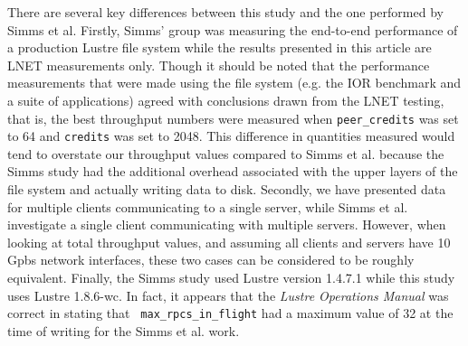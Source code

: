 \documentclass[]{sigplan-proc}
\begin{document}
There are several key differences between this study and the one performed by Simms et al. Firstly, Simms'
group was measuring the end-to-end performance of a production Lustre file system while the results presented
in this article are LNET measurements only. Though it should be noted that the performance measurements that
were made using the file system (e.g. the IOR benchmark and a suite of applications) agreed with conclusions
drawn from the LNET testing, that is, the best throughput numbers were measured when {\tt peer\_credits} was
set to 64 and {\tt credits} was set to 2048. This difference in quantities measured would tend to overstate
our throughput values compared to Simms et al. because the Simms study had the additional overhead associated
with the upper layers of the file system and actually writing data to disk. Secondly, we have presented data
for multiple clients communicating to a single server, while Simms et al. investigate a single client
communicating with multiple servers. However, when looking at total throughput values, and assuming all
clients and servers have 10 Gpbs network interfaces, these two cases can be considered to be roughly
equivalent. Finally, the Simms study used Lustre version 1.4.7.1 while this study uses Lustre 1.8.6-wc. In
fact, it appears that the {\it Lustre Operations Manual} was correct in stating that {\tt
  max\_rpcs\_in\_flight} had a maximum value of 32 at the time of writing for the Simms et al. work.
\end{document}
